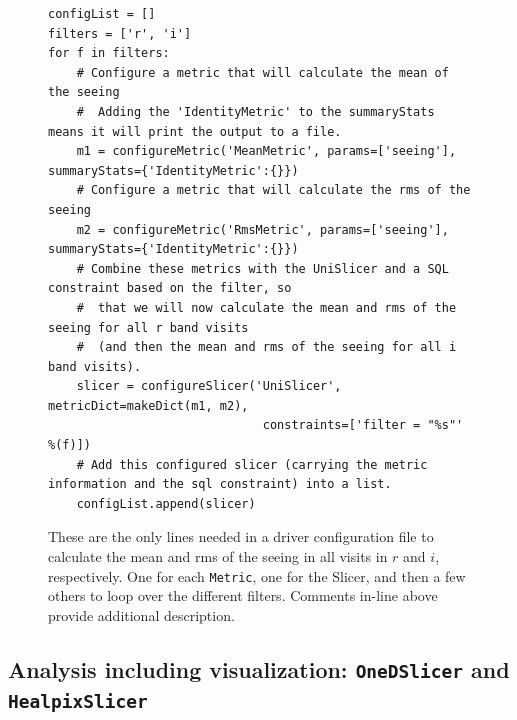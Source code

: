 \documentclass[]{spie}  %
\begin{document}
\begin{figure}
\centering
\begin{lstlisting}[frame=single]
configList = []
filters = ['r', 'i']
for f in filters:
    # Configure a metric that will calculate the mean of the seeing
    #  Adding the 'IdentityMetric' to the summaryStats means it will print the output to a file.
    m1 = configureMetric('MeanMetric', params=['seeing'], summaryStats={'IdentityMetric':{}})
    # Configure a metric that will calculate the rms of the seeing
    m2 = configureMetric('RmsMetric', params=['seeing'], summaryStats={'IdentityMetric':{}})
    # Combine these metrics with the UniSlicer and a SQL constraint based on the filter, so
    #  that we will now calculate the mean and rms of the seeing for all r band visits
    #  (and then the mean and rms of the seeing for all i band visits).
    slicer = configureSlicer('UniSlicer', metricDict=makeDict(m1, m2),
                              constraints=['filter = "%s"' %(f)])
    # Add this configured slicer (carrying the metric information and the sql constraint) into a list.
    configList.append(slicer)

\end{lstlisting}
\caption[]
{ \label{fig:simpleDriver} These are the only lines needed in a driver
configuration file to calculate the mean and rms of the seeing in all visits in $r$
and $i$, respectively. One for each {\tt Metric}, one for the Slicer, and
then a few others to loop over the different filters. Comments in-line
above provide additional description.}
\end{figure}

\subsection{Analysis including visualization: {\tt OneDSlicer} and
  {\tt HealpixSlicer}}
\end{document}
